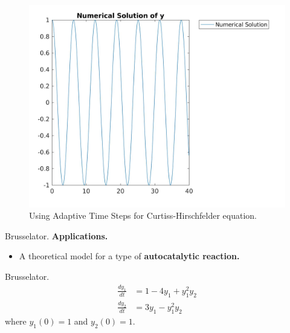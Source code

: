\documentclass[9pt]{beamer}
\numberwithin{equation}{section}
\begin{document}
\begin{frame}
\begin{figure}
\centering
\includegraphics[scale=0.15]{ats_ch_y_1}
\caption{Using Adaptive Time Steps for Curtiss-Hirschfelder equation.}
\end{figure}
\end{frame}


\begin{frame}{Brusselator.}
\textbf{\textsf{Applications.}}
\begin{itemize}
\item A theoretical model for a type of \textbf{autocatalytic reaction.}
\end{itemize}
\begin{block}{Brusselator.}
\begin{subequations}
\begin{align}
    \frac{dy_1}{dt}  &=  1 - 4y_1 + y_1^2 y_2
    \\
    \frac{dy_2}{dt}  &=  3y_1 - y_1^2 y_2
\end{align}
\end{subequations}
where $y_1(0) = 1$ and $y_2(0) = 1$.
\end{block}
\end{frame}
\end{document}
